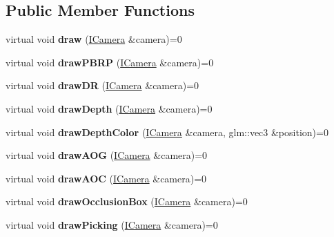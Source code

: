 \subsection*{Public Member Functions}
\begin{DoxyCompactItemize}
\item 
\mbox{\label{classflw_1_1flf_1_1IDrawable_ad94201dc7ac4f3e94b86b0b8d8d6b597}} 
virtual void {\bfseries draw} (\hyperlink{classflw_1_1flf_1_1ICamera}{I\+Camera} \&camera)=0
\item 
\mbox{\label{classflw_1_1flf_1_1IDrawable_aaadbf5d74624af32ea8b5064502aced0}} 
virtual void {\bfseries draw\+P\+B\+RP} (\hyperlink{classflw_1_1flf_1_1ICamera}{I\+Camera} \&camera)=0
\item 
\mbox{\label{classflw_1_1flf_1_1IDrawable_a38b6d894083451f43f220d96f73a8a65}} 
virtual void {\bfseries draw\+DR} (\hyperlink{classflw_1_1flf_1_1ICamera}{I\+Camera} \&camera)=0
\item 
\mbox{\label{classflw_1_1flf_1_1IDrawable_a38142c33f088087a0c2c7879a73d9c72}} 
virtual void {\bfseries draw\+Depth} (\hyperlink{classflw_1_1flf_1_1ICamera}{I\+Camera} \&camera)=0
\item 
\mbox{\label{classflw_1_1flf_1_1IDrawable_ae67b0f617e1e0cc5fb4fb63d7df95a41}} 
virtual void {\bfseries draw\+Depth\+Color} (\hyperlink{classflw_1_1flf_1_1ICamera}{I\+Camera} \&camera, glm\+::vec3 \&position)=0
\item 
\mbox{\label{classflw_1_1flf_1_1IDrawable_a3b98b73690d52c7638dad261e7180914}} 
virtual void {\bfseries draw\+A\+OG} (\hyperlink{classflw_1_1flf_1_1ICamera}{I\+Camera} \&camera)=0
\item 
\mbox{\label{classflw_1_1flf_1_1IDrawable_af5096dd51585f38717f0d250cc839ad0}} 
virtual void {\bfseries draw\+A\+OC} (\hyperlink{classflw_1_1flf_1_1ICamera}{I\+Camera} \&camera)=0
\item 
\mbox{\label{classflw_1_1flf_1_1IDrawable_a479fa858127eb85c200ad32bd672c3e9}} 
virtual void {\bfseries draw\+Occlusion\+Box} (\hyperlink{classflw_1_1flf_1_1ICamera}{I\+Camera} \&camera)=0
\item 
\mbox{\label{classflw_1_1flf_1_1IDrawable_a497b4bf675dca36654e98f114cd6953f}} 
virtual void {\bfseries draw\+Picking} (\hyperlink{classflw_1_1flf_1_1ICamera}{I\+Camera} \&camera)=0
\end{DoxyCompactItemize}


